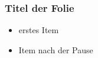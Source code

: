 \documentclass{beamer}
\begin{document}
 \begin{frame}
   \frametitle{Titel der Folie}
   \begin{itemize}
     \item erstes Item 
       \pause
     \item Item nach der Pause
   \end{itemize}
 \end{frame}
 
\end{document}
